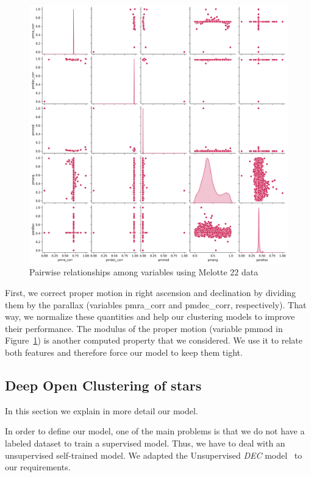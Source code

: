 \documentclass[11pt,a4paper,english,twocolumn]{article}
\begin{document}
\begin{figure}[!hbt]
  \centering
  \includegraphics[scale=0.5]{../figures/melotte_22/features_melotte_22.png}
  \caption{Pairwise relationships among variables using Melotte 22 data}
  \label{fig:features_melotte_22}
\end{figure}

First, we correct proper motion in right ascension and declination by dividing them by
the parallax (variables pmra\_corr and pmdec\_corr, respectively). That way, we normalize
these quantities and help our clustering models to improve their performance. The modulus
of the proper motion (variable pmmod in Figure~\ref{fig:features_melotte_22}) is another
computed property that we considered. We use it to relate both features and therefore
force our model to keep them tight.

\subsection{Deep Open Clustering of stars}
\label{sec:deep_open_clustering}

In this section we explain in more detail our model.

In order to define our model, one of the main problems is that we do not have a labeled
dataset to train a supervised model. Thus, we have to deal with an unsupervised self-trained
model. We adapted the Unsupervised \emph{DEC} model~\cite{xie2016unsupervised} to our requirements.
\end{document}
